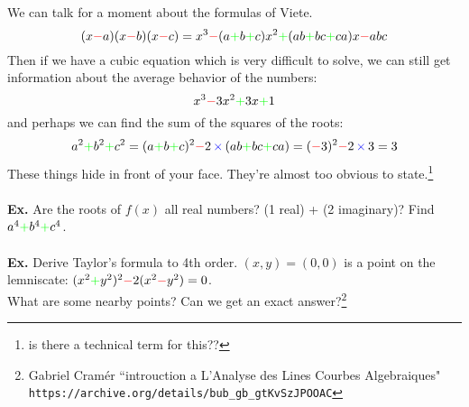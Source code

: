 \documentclass[12pt]{article}
\begin{document}
\newpage 
\noindent 
We can talk for a moment about the formulas of V{\color{blue}i}ete. 
$$ (x{\color{red}-}a)(x{\color{red}-}b)(x{\color{red}-}c) = x^3 {\color{red}-} (a{\color{green}+}b{\color{green}+}c)x^2 {\color{green}+} (ab{\color{green}+}bc{\color{green}+}ca)x {\color{red}-}abc $$
Then {\color{blue}i}f we have a cub{\color{blue}i}c equat{\color{blue}i}on wh{\color{blue}i}ch {\color{blue}i}s very d{\color{blue}i}ff{\color{blue}i}cult to solve, we can st{\color{blue}i}ll get {\color{blue}i}nformat{\color{blue}i}on about the average behav{\color{blue}i}or of the numbers:
$$ x^3 {\color{red}-} 3x^2 {\color{green}+} 3x {\color{green}+} 1$$
and perhaps we can f{\color{blue}i}nd the sum of the squares of the roots:
$$ a^2 {\color{green}+} b^2 {\color{green}+} c^2 = 
(a{\color{green}+}b{\color{green}+}c)^2 {\color{red}-} 2 {\color{blue}\,\times\,} (ab {\color{green}+} bc {\color{green}+} ca) = ({\color{red}-}3)^2 {\color{red}-} 2 {\color{blue}\,\times\,} 3 = 3 $$
These th{\color{blue}i}ngs h{\color{blue}i}de  {\color{blue}i}n front of your face.  They're almost too obv{\color{blue}i}ous to state.\footnote{{\color{blue}i}s there a techn{\color{blue}i}cal term for th{\color{blue}i}s??} \\ \\
\textbf{Ex.} Are the roots of $f(x)$ all real numbers? (1 real) {\color{green}+} (2 {\color{blue}i}mag{\color{blue}i}nary)?  F{\color{blue}i}nd $a^4 {\color{green}+} b^4 {\color{green}+} c^4$. \\ \\
\textbf{Ex.} Der{\color{blue}i}ve Taylor's formula to 4th order.  $(x,y)=(0,0)$ {\color{blue}i}s a po{\color{blue}i}nt on the lemn{\color{blue}i}scate: $(x^2 {\color{green}+} y^2)^2 {\color{red}-} 2(x^2 {\color{red}-} y^2)=0$. \\ What are some nearby po{\color{blue}i}nts?  Can we get an exact answer?\footnote{Gabr{\color{blue}i}el Cram\'{e}r ``{\color{blue}i}ntrouct{\color{blue}i}on a L'Analyse des L{\color{blue}i}nes Courbes Algebra{\color{blue}i}ques" \\ \texttt{https://arch{\color{blue}i}ve.org/deta{\color{blue}i}ls/bub\_gb\_gtKvSzJPOOAC}} 
\end{document}
